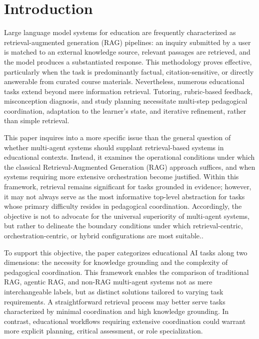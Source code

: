 \section{Introduction}

Large language model systems for education are frequently characterized as retrieval-augmented generation (RAG) pipelines: an inquiry submitted by a user is matched to an external knowledge source, relevant passages are retrieved, and the model produces a substantiated response. This methodology proves effective, particularly when the task is predominantly factual, citation-sensitive, or directly answerable from curated course materials. Nevertheless, numerous educational tasks extend beyond mere information retrieval. Tutoring, rubric-based feedback, misconception diagnosis, and study planning necessitate multi-step pedagogical coordination, adaptation to the learner's state, and iterative refinement, rather than simple retrieval.

This paper inquires into a more specific issue than the general question of whether multi-agent systems should supplant retrieval-based systems in educational contexts. Instead, it examines the operational conditions under which the classical Retrieval-Augmented Generation (RAG) approach suffices, and when systems requiring more extensive orchestration become justified. Within this framework, retrieval remains significant for tasks grounded in evidence; however, it may not always serve as the most informative top-level abstraction for tasks whose primary difficulty resides in pedagogical coordination. Accordingly, the objective is not to advocate for the universal superiority of multi-agent systems, but rather to delineate the boundary conditions under which retrieval-centric, orchestration-centric, or hybrid configurations are most suitable..

To support this objective, the paper categorizes educational AI tasks along two dimensions: the necessity for knowledge grounding and the complexity of pedagogical coordination. This framework enables the comparison of traditional RAG, agentic RAG, and non-RAG multi-agent systems not as mere interchangeable labels, but as distinct solutions tailored to varying task requirements. A straightforward retrieval process may better serve tasks characterized by minimal coordination and high knowledge grounding. In contrast, educational workflows requiring extensive coordination could warrant more explicit planning, critical assessment, or role specialization.

